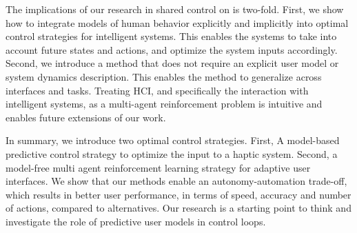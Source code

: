 The implications of our research in shared control on \interfaces is two-fold. First, we show how to integrate models of human behavior explicitly and implicitly into optimal control strategies for intelligent systems. This enables the systems to take into account future states and actions, and optimize the system inputs accordingly. Second, we introduce a method that does not require an explicit user model or system dynamics description. This enables the method to generalize across interfaces and tasks. Treating HCI, and specifically the interaction with intelligent systems, as a multi-agent reinforcement problem is intuitive and enables future extensions of our work.  

In summary, we introduce two optimal control strategies. First, A model-based predictive control strategy to optimize the input to a haptic system. Second, a model-free multi agent reinforcement learning strategy for adaptive user interfaces. We show that our methods enable an autonomy-automation trade-off, which results in better user performance, in terms of speed, accuracy and number of actions, compared to alternatives. Our research is a starting point to think and investigate the role of predictive user models in control loops. 